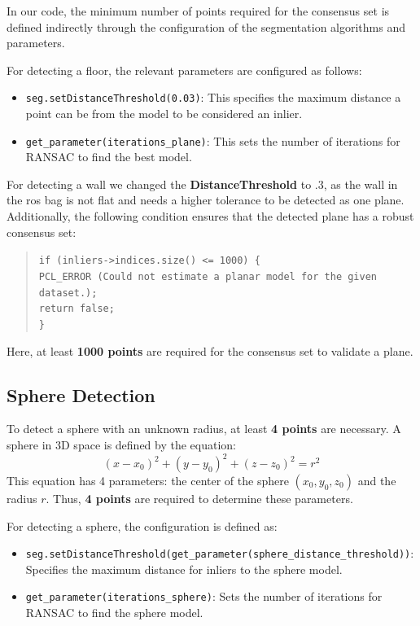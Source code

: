 \documentclass[template,12pt,a4paper,enabledeprecatedfontcommands]{template}
\begin{document}
\noindent In our code, the minimum number of points required for the consensus set is defined indirectly through the configuration of the segmentation algorithms and parameters.

\noindent For detecting a floor, the relevant parameters are configured as follows:
\begin{itemize}
    \item \texttt{seg.setDistanceThreshold(0.03)}: This specifies the maximum distance a point can be from the model to be considered an inlier.
    \item \texttt{get\_parameter(iterations\_plane)}: This sets the number of iterations for RANSAC to find the best model.
\end{itemize}

\noindent For detecting a wall we changed the \textbf{DistanceThreshold} to $.3$, as the wall in the ros bag is not flat and needs a higher tolerance to be detected as one plane.\\
\newline
Additionally, the following condition ensures that the detected plane has a robust consensus set:
\begin{quote}
\texttt{if (inliers->indices.size() <= 1000) \{\\
    PCL\_ERROR (Could not estimate a planar model for the given dataset.);\\
    return false;\\
\}}
\end{quote}
Here, at least \textbf{1000 points} are required for the consensus set to validate a plane.

\subsection*{Sphere Detection}

To detect a sphere with an unknown radius, at least \textbf{4 points} are necessary. A sphere in 3D space is defined by the equation:
\[
(x - x_0)^2 + (y - y_0)^2 + (z - z_0)^2 = r^2
\]
This equation has 4 parameters: the center of the sphere \((x_0, y_0, z_0)\) and the radius \(r\). Thus, \textbf{4 points} are required to determine these parameters.


For detecting a sphere, the configuration is defined as:
\begin{itemize}
    \item \texttt{seg.setDistanceThreshold(get\_parameter(sphere\_distance\_threshold))}: Specifies the maximum distance for inliers to the sphere model.
    \item \texttt{get\_parameter(iterations\_sphere)}: Sets the number of iterations for RANSAC to find the sphere model.
\end{itemize}
\end{document}
